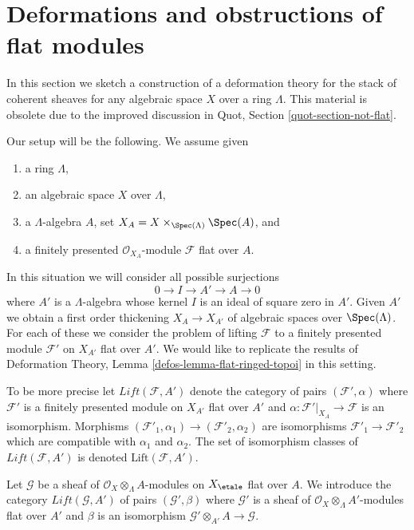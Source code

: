 \section{Deformations and obstructions of flat modules}
\label{section-modules}

\noindent
In this section we sketch a construction of a deformation theory for the
stack of coherent sheaves for any algebraic space $X$ over a ring $\Lambda$.
This material is obsolete due to the improved discussion in
Quot, Section \ref{quot-section-not-flat}.

\medskip\noindent
Our setup will be the following. We assume given
\begin{enumerate}
\item a ring $\Lambda$,
\item an algebraic space $X$ over $\Lambda$,
\item a $\Lambda$-algebra $A$, set
$X_A = X \times_{\Spec(\Lambda)} \Spec(A)$, and
\item a finitely presented $\mathcal{O}_{X_A}$-module $\mathcal{F}$
flat over $A$.
\end{enumerate}
In this situation we will consider all possible surjections
$$
0 \to I \to A' \to A \to 0
$$
where $A'$ is a $\Lambda$-algebra whose kernel $I$ is an ideal of square zero
in $A'$. Given $A'$ we obtain a first order thickening $X_A \to X_{A'}$
of algebraic spaces over $\Spec(\Lambda)$. For each of these we consider
the problem of lifting $\mathcal{F}$ to a finitely presented module
$\mathcal{F}'$ on $X_{A'}$ flat over $A'$. We would like to replicate the
results of Deformation Theory, Lemma \ref{defos-lemma-flat-ringed-topoi}
in this setting.

\medskip\noindent
To be more precise let $\textit{Lift}(\mathcal{F}, A')$ denote the category
of pairs $(\mathcal{F}', \alpha)$ where $\mathcal{F}'$ is a
finitely presented module on $X_{A'}$ flat over $A'$ and
$\alpha : \mathcal{F}'|_{X_A} \to \mathcal{F}$ is an isomorphism.
Morphisms $(\mathcal{F}'_1, \alpha_1) \to (\mathcal{F}'_2, \alpha_2)$
are isomorphisms $\mathcal{F}'_1 \to \mathcal{F}'_2$ which are compatible
with $\alpha_1$ and $\alpha_2$.
The set of isomorphism classes of $\textit{Lift}(\mathcal{F}, A')$
is denoted $\text{Lift}(\mathcal{F}, A')$.

\medskip\noindent
Let $\mathcal{G}$ be a sheaf of $\mathcal{O}_X \otimes_\Lambda A$-modules
on $X_\etale$ flat over $A$. We introduce the category
$\textit{Lift}(\mathcal{G}, A')$ of pairs
$(\mathcal{G}', \beta)$ where $\mathcal{G}'$ is a sheaf of
$\mathcal{O}_X \otimes_\Lambda A'$-modules flat over $A'$ and $\beta$
is an isomorphism $\mathcal{G}' \otimes_{A'} A \to \mathcal{G}$.

